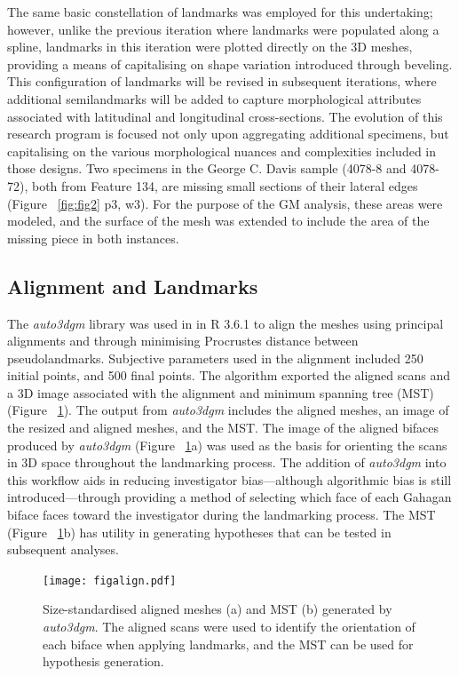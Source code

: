 \documentclass[review]{elsarticle}
\begin{document}
The same basic constellation of landmarks was employed for this undertaking; however, unlike the previous iteration where landmarks were populated along a spline, landmarks in this iteration were plotted directly on the 3D meshes, providing a means of capitalising on shape variation introduced through beveling. This configuration of landmarks will be revised in subsequent iterations, where additional semilandmarks will be added to capture morphological attributes associated with latitudinal and longitudinal cross-sections. The evolution of this research program is focused not only upon aggregating additional specimens, but capitalising on the various morphological nuances and complexities included in those designs. Two specimens in the George C. Davis sample (4078-8 and 4078-72), both from Feature 134, are missing small sections of their lateral edges (Figure ~\ref{fig:fig2} p3, w3). For the purpose of the GM analysis, these areas were modeled, and the surface of the mesh was extended to include the area of the missing piece in both instances.

\subsection*{Alignment and Landmarks}

The \textit{auto3dgm} library \citep{RN20822} was used in in R 3.6.1 \citep{R} to align the meshes using principal alignments and through minimising Procrustes distance between pseudolandmarks. Subjective parameters used in the alignment included 250 initial points, and 500 final points. The algorithm exported the aligned scans and a 3D image associated with the alignment and minimum spanning tree (MST) (Figure ~\ref{fig:fig4}). The output from \textit{auto3dgm} includes the aligned meshes, an image of the resized and aligned meshes, and the MST. The image of the aligned bifaces produced by \textit{auto3dgm} (Figure ~\ref{fig:fig4}a) was used as the basis for orienting the scans in 3D space throughout the landmarking process. The addition of \textit{auto3dgm} into this workflow aids in reducing investigator bias---although algorithmic bias is still introduced---through providing a method of selecting which face of each Gahagan biface faces toward the investigator during the landmarking process. The MST (Figure ~\ref{fig:fig4}b) has utility in generating hypotheses that can be tested in subsequent analyses.

\begin{figure}[ht]\centering
\texttt{[image: figalign.pdf]}
\caption{Size-standardised aligned meshes (a) and MST (b) generated by \textit{auto3dgm}. The aligned scans were used to identify the orientation of each biface when applying landmarks, and the MST can be used for hypothesis generation.}
\label{fig:fig4}
\end{figure}
\end{document}

